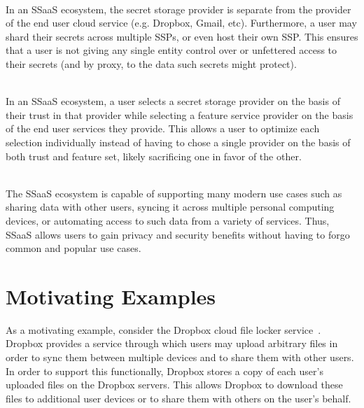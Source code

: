 \begin{packed_desc}
\item[No Single Trusted Third Party] \hfill \\ In an SSaaS ecosystem,
  the secret storage provider is separate from the provider of the
  end user cloud service (e.g. Dropbox, Gmail, etc). Furthermore, a
  user may shard their secrets across multiple SSPs, or even host
  their own SSP. This ensures that a user is not giving any single
  entity control over or unfettered access to their secrets (and by
  proxy, to the data such secrets might protect).
\item[Separation of Duties] \hfill \\ In an SSaaS ecosystem, a user
  selects a secret storage provider on the basis of their trust in
  that provider while selecting a feature service provider on the
  basis of the end user services they provide. This allows a user to
  optimize each selection individually instead of having to chose a
  single provider on the basis of both trust and feature set, likely
  sacrificing one in favor of the other.
\item[Support for Existing Use Cases] \hfill \\ The SSaaS ecosystem is
  capable of supporting many modern use cases such as sharing data
  with other users, syncing it across multiple personal computing
  devices, or automating access to such data from a variety of
  services. Thus, SSaaS allows users to gain privacy and security
  benefits without having to forgo common and popular use cases.
\end{packed_desc}

\section{Motivating Examples}
\label{chap:intro:example}

As a motivating example, consider the Dropbox cloud file locker
service~\cite{dropbox}. Dropbox provides a service through which users
may upload arbitrary files in order to sync them between multiple
devices and to share them with other users. In order to support this
functionally, Dropbox stores a copy of each user's uploaded files on
the Dropbox servers. This allows Dropbox to download these files to
additional user devices or to share them with others on the user's
behalf.

